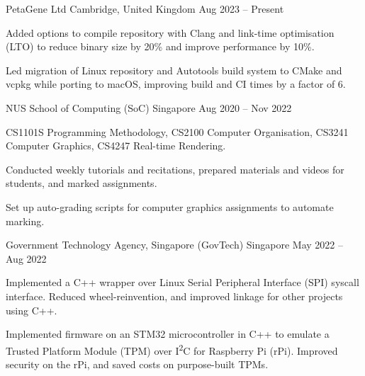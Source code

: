 \begin{cventries}
	{PetaGene Ltd} %
	{Cambridge, United Kingdom} %
	{Aug 2023 -- Present} %
	{
		\begin{cvitems} %
			\item Added options to compile repository with Clang and link-time optimisation (LTO) to reduce binary size by 20\% and improve performance by 10\%.
			\item Led migration of Linux repository and Autotools build system to CMake and vcpkg while porting to macOS, improving build and CI times by a factor of 6.
		\end{cvitems}
	}


	{NUS School of Computing (SoC)} %
	{Singapore} %
	{Aug 2020 -- Nov 2022} %
	{
		\begin{cvitems} %
			\item CS1101S Programming Methodology, CS2100 Computer Organisation, CS3241 Computer Graphics, CS4247 Real-time Rendering.
			\item Conducted weekly tutorials and recitations, prepared materials and videos for students, and marked assignments.
			\item Set up auto-grading scripts for computer graphics assignments to automate marking.
		\end{cvitems}
	}


	{Government Technology Agency, Singapore (GovTech)} %
	{Singapore} %
	{May 2022 -- Aug 2022} %
	{
		\begin{cvitems} %
			\item Implemented a C++ wrapper over Linux Serial Peripheral Interface (SPI) syscall interface. Reduced wheel-reinvention, and improved linkage for other projects using C++.
			\item Implemented firmware on an STM32 microcontroller in C++ to emulate a Trusted Platform Module (TPM) over I\textsuperscript{2}C for Raspberry Pi (rPi). Improved security on the rPi, and saved costs on purpose-built TPMs.
		\end{cvitems}
	}


\end{cventries}
